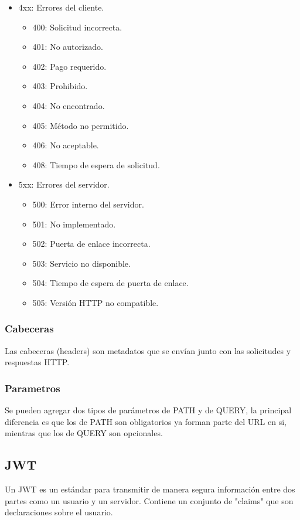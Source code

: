 \begin{center}
\begin{itemize}
		\item 4xx: Errores del cliente.
		      \begin{itemize}
			      \item 400: Solicitud incorrecta.
			      \item 401: No autorizado.
			      \item 402: Pago requerido.
			      \item 403: Prohibido.
			      \item 404: No encontrado.
			      \item 405: Método no permitido.
			      \item 406: No aceptable.
			      \item 408: Tiempo de espera de solicitud.
		      \end{itemize}
		\item 5xx: Errores del servidor.
		\begin{itemize}
            \item 500: Error interno del servidor.
            \item 501: No implementado.
            \item 502: Puerta de enlace incorrecta.
            \item 503: Servicio no disponible.
            \item 504: Tiempo de espera de puerta de enlace.
            \item 505: Versión HTTP no compatible.
        \end{itemize}
	\end{itemize}

    \subsubsection{Cabeceras}
    Las cabeceras (headers) son metadatos que se envían junto con las solicitudes y respuestas HTTP.
    \subsubsection{Parametros}
    Se pueden agregar dos tipos de parámetros de PATH y de QUERY, la principal
    diferencia es que los de PATH son obligatorios ya forman parte del URL en si,
    mientras que los de QUERY son opcionales.

    \subsection{JWT}
    Un JWT es un estándar para transmitir de manera segura información entre dos partes como un usuario y 
    un servidor. Contiene un conjunto de "claims" que son declaraciones sobre el usuario.

\end{center}
